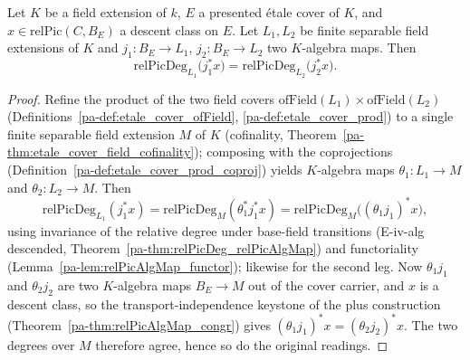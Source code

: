 \begin{theorem}
  \label{pa-thm:relPicDeg_relPicAlgMap_congr}
  \leanok

  Let \(K\) be a field extension of \(k\), \(E\) a presented \'etale cover of \(K\), and
  \(x \in \mathrm{relPic}(C, B_E)\) a descent class on \(E\). Let \(L_1, L_2\) be finite
  separable field extensions of \(K\) and \(j_1 \colon B_E \to L_1\),
  \(j_2 \colon B_E \to L_2\) two \(K\)-algebra maps. Then
  \[
    \mathrm{relPicDeg}_{L_1}\bigl(j_1^{*} x\bigr)
      = \mathrm{relPicDeg}_{L_2}\bigl(j_2^{*} x\bigr).
  \]
\end{theorem}
\begin{proof}
  \leanok
  Refine the product of the two field covers \(\mathrm{ofField}(L_1) \times
  \mathrm{ofField}(L_2)\) (Definitions~\ref{pa-def:etale_cover_ofField},
  \ref{pa-def:etale_cover_prod}) to a single finite separable field extension \(M\) of \(K\)
  (cofinality, Theorem~\ref{pa-thm:etale_cover_field_cofinality}); composing with the
  coprojections (Definition~\ref{pa-def:etale_cover_prod_coproj}) yields \(K\)-algebra maps
  \(\theta_1 \colon L_1 \to M\) and \(\theta_2 \colon L_2 \to M\). Then
  \[
    \mathrm{relPicDeg}_{L_1}(j_1^{*} x)
      = \mathrm{relPicDeg}_{M}(\theta_1^{*} j_1^{*} x)
      = \mathrm{relPicDeg}_{M}\bigl((\theta_1 j_1)^{*} x\bigr),
  \]
  using invariance of the relative degree under base-field transitions (E-iv-alg descended,
  Theorem~\ref{pa-thm:relPicDeg_relPicAlgMap}) and functoriality
  (Lemma~\ref{pa-lem:relPicAlgMap_functor}); likewise for the second leg. Now \(\theta_1 j_1\)
  and \(\theta_2 j_2\) are two \(K\)-algebra maps \(B_E \to M\) out of the cover carrier, and
  \(x\) is a descent class, so the transport-independence keystone of the plus construction
  (Theorem~\ref{pa-thm:relPicAlgMap_congr}) gives \((\theta_1 j_1)^{*} x = (\theta_2 j_2)^{*} x\).
  The two degrees over \(M\) therefore agree, hence so do the original readings.
\end{proof}

